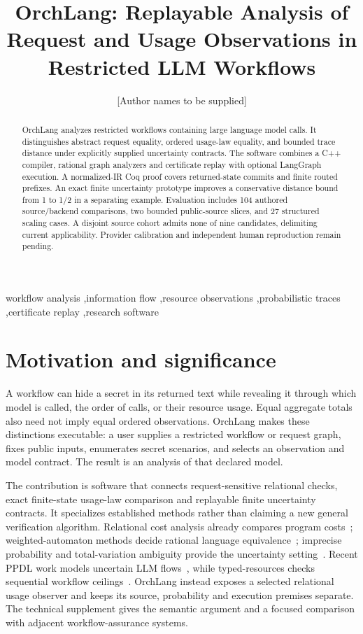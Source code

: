 \documentclass[preprint,12pt,a4paper]{elsarticle}
\begin{document}
\begin{frontmatter}
\title{OrchLang: Replayable Analysis of Request and Usage Observations in Restricted LLM Workflows}
\author{[Author names to be supplied]}
\address{[Affiliations and correspondence to be supplied]}
\begin{abstract}
OrchLang analyzes restricted workflows containing large language model calls. It distinguishes abstract request equality, ordered usage-law equality, and bounded trace distance under explicitly supplied uncertainty contracts. The software combines a C++ compiler, rational graph analyzers and certificate replay with optional LangGraph execution. A normalized-IR Coq proof covers returned-state commits and finite routed prefixes. An exact finite uncertainty prototype improves a conservative distance bound from 1 to 1/2 in a separating example. Evaluation includes 104 authored source/backend comparisons, two bounded public-source slices, and 27 structured scaling cases. A disjoint source cohort admits none of nine candidates, delimiting current applicability. Provider calibration and independent human reproduction remain pending.
\end{abstract}
\begin{keyword}
workflow analysis \sep information flow \sep resource observations \sep probabilistic traces \sep certificate replay \sep research software
\end{keyword}
\end{frontmatter}

\section{Motivation and significance}
A workflow can hide a secret in its returned text while revealing it through which model is called, the order of calls, or their resource usage. Equal aggregate totals also need not imply equal ordered observations. OrchLang makes these distinctions executable: a user supplies a restricted workflow or request graph, fixes public inputs, enumerates secret scenarios, and selects an observation and model contract. The result is an analysis of that declared model.

The contribution is software that connects request-sensitive relational checks, exact finite-state usage-law comparison and replayable finite uncertainty contracts. It specializes established methods rather than claiming a new general verification algorithm. Relational cost analysis already compares program costs~\cite{relcost}; weighted-automaton methods decide rational language equivalence~\cite{kiefer}; imprecise probability and total-variation ambiguity provide the uncertainty setting~\cite{cooman,tzortzis}. Recent PPDL work models uncertain LLM flows~\cite{ppdl}, while typed-resources checks sequential workflow ceilings~\cite{typed}. OrchLang instead exposes a selected relational usage observer and keeps its source, probability and execution premises separate. The technical supplement gives the semantic argument and a focused comparison with adjacent workflow-assurance systems.
\end{document}
